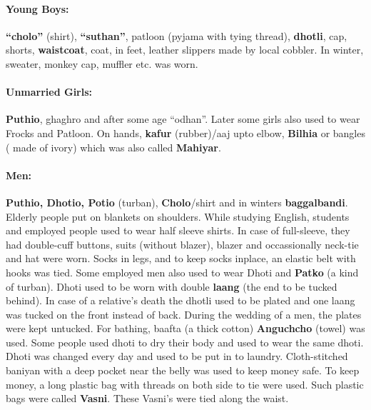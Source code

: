 \paragraph{Young Boys:} \textbf{``cholo''} (shirt), \textbf{``suthan''}, patloon (pyjama with tying thread), \textbf{dhotli}, cap, shorts, \textbf{waistcoat}, coat, in feet, leather slippers made by local cobbler. In winter, sweater, monkey cap, muffler etc. was worn.
\paragraph{Unmarried Girls:} \textbf{Puthio}, ghaghro and after some age ``odhan''. Later some girls also used to wear Frocks and Patloon. On hands, \textbf{kafur} (rubber)/aaj upto elbow, \textbf{Bilhia} or bangles ( made of ivory) which was also called \textbf{Mahiyar}.
\paragraph{Men:} \textbf{Puthio, Dhotio, Potio} (turban), \textbf{Cholo}/shirt and in winters \textbf{baggalbandi}. Elderly people put on blankets on shoulders. While studying English, students and employed people used to wear half sleeve shirts. In case of full-sleeve, they had double-cuff buttons, suits (without blazer), blazer and occassionally neck-tie and hat were worn. Socks in legs, and to keep socks inplace, an elastic belt with hooks was tied. Some employed men also used to wear Dhoti and \textbf{Patko} (a kind of turban).
Dhoti used to be worn with double \textbf{laang} (the end to be tucked behind). In case of a relative's death the dhotli used to be plated and one laang was tucked on the front instead of back. During the wedding of a men, the plates were kept untucked.
For bathing, baafta (a thick cotton) \textbf{Anguchcho} (towel) was used. Some people used dhoti to dry their body and used to wear the same dhoti. Dhoti was changed every day and used to be put in to laundry. Cloth-stitched baniyan with a deep pocket near the belly was used to keep money safe. To keep money, a long plastic bag with threads on both side to tie were used. Such plastic bags were called \textbf{Vasni}. These Vasni's were tied along the waist.
